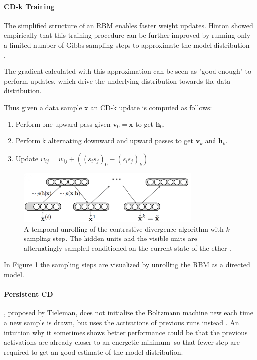 \paragraph{CD-k Training} \label{c:cdk}

The simplified structure of an RBM enables faster weight updates. 
Hinton showed empirically that this training procedure can be further improved by running only a limited number of Gibbs sampling steps to approximate the model distribution \cite{hinton2002training}.

The gradient calculated with this approximation can be seen as "good enough" to perform updates, which drive the underlying distribution towards the data distribution.

Thus given a data sample $\textbf{x}$ an CD-k update is computed as follows:
\begin{enumerate}
\item Perform one upward pass given $\textbf{v}_0=\textbf{x}$ to get $\textbf{h}_0$.
\item Perform k alternating downward and upward passes to get $\textbf{v}_k$ and $\textbf{h}_k$.
\item Update $w_{ij} = w_{ij} + ( (s_i s_j)_0 - (s_i s_j)_k ) $ 
\end{enumerate} 

\begin{figure}
	\centering
    	\includegraphics[width=0.8\textwidth]{imgs/cd.png} 
    \caption{A temporal unrolling of the contrastive divergence algorithm with $k$ sampling step. The hidden units and the visible units are alternatingly sampled conditioned on the current state of the other \cite{cdImg}.}
	\label{fig:cd}
\end{figure}

In Figure \ref{fig:cd} the sampling steps are visualized by unrolling the RBM as a directed model.

\paragraph{Persistent CD} \label{c:pcd}

, proposed by Tieleman, does not initialize the Boltzmann machine new each time a new sample is drawn, but uses the activations of previous runs instead \cite{tieleman2008training}. An intuition why it sometimes shows better performance could be that the previous activations are already closer to an energetic minimum, so that fewer step are required to get an good estimate of the model distribution. 


